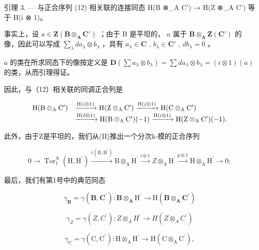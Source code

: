 引理 3. --- 与正合序列 (12) 相关联的连接同态 H(B ⊗\_A C') → H(Z ⊗\_A C') 等于 H(i ⊗ 1)。

事实上，设 \(a \in \mathbf{Z}(\mathbf{B} \otimes_{\mathbf{A}} \mathbf{C}')\) ；由于 B 是平坦的， \(a\) 属于 \(\mathbf{B} \otimes_{\mathbf{A}} \mathbf{Z}(\mathbf{C}')\) 的像，因此可以写成 \(\sum_{\lambda} da_{\lambda} \otimes b_{\lambda}\) ，具有 \(a_{\lambda} \in \mathbf{C}\) , \(b_{\lambda} \in \mathbf{C}'\) , \(db_{\lambda} = 0\) 。

\(a\) 的类在所求同态下的像按定义是 \(\mathbf{D}(\sum a_{\lambda}\otimes b_{\lambda})=\sum da_{\lambda}\otimes b_{\lambda}=(i\otimes1)(a)\) 的类，从而引理得证。

因此，与（12）相关联的同调正合列是

\[
\begin{array}{r l} \mathrm{H} (\mathrm{B} \otimes_ {\mathrm{A}} \mathrm{C} ^ {\prime}) & \xrightarrow {\mathrm{H} (i \otimes 1)} \mathrm{H} (\mathrm{Z} \otimes_ {\mathrm{A}} \mathrm{C} ^ {\prime}) \xrightarrow {\mathrm{H} (j \otimes 1)} \mathrm{H} (\mathrm{C} \otimes_ {\mathrm{A}} \mathrm{C} ^ {\prime}) \\ & \xrightarrow {\mathrm{H} (\delta \otimes 1)} \mathrm{H} (\mathrm{B} \otimes_ {\mathrm{A}} \mathrm{C} ^ {\prime}) (- 1) \xrightarrow {\mathrm{H} (i \otimes 1)} \mathrm{H} (\mathrm{Z} \otimes_ {\mathrm{A}} \mathrm{C} ^ {\prime}) (- 1). \end{array}
\]

此外，由于Z是平坦的，我们从(II)推出一个分次k-模的正合序列

\[
0 \longrightarrow \operatorname{Tor} _ {1} ^ {\mathrm{A}} (\mathrm{H}, \mathrm{H} ^ {\prime}) \xrightarrow {\hat {c} (\mathrm{II} , \mathrm{H} ^ {\prime})} \mathrm{B} \otimes_ {\mathrm{A}} \mathrm{H} ^ {\prime} \xrightarrow {i \otimes 1} Z \otimes_ {\mathrm{A}} \mathrm{H} ^ {\prime} \xrightarrow {p \otimes 1} \mathrm{H} \otimes_ {\mathrm{A}} \mathrm{H} ^ {\prime} \longrightarrow 0;
\]

最后，我们有第1号中的典范同态

\[
\gamma_ {\mathbf {B}} = \gamma (\mathbf {B}, \mathbf {C} ^ {\prime}): \mathbf {B} \otimes_ {\mathbf {A}} \mathrm{H} ^ {\prime} \rightarrow \mathrm{H} (\mathbf {B} \otimes_ {\mathbf {A}} \mathbf {C} ^ {\prime})
\]

\[
\gamma_ {Z} = \gamma (Z, C ^ {\prime}): Z \otimes_ {A} H ^ {\prime} \rightarrow H (Z \otimes_ {A} C ^ {\prime})
\]

\[
\gamma_ {\mathrm{C}} = \gamma (\mathrm{C}, \mathrm{C} ^ {\prime}): \mathrm{H} \otimes_ {\mathrm{A}} \mathrm{H} ^ {\prime} \rightarrow \mathrm{H} (\mathrm{C} \otimes_ {\mathrm{A}} \mathrm{C} ^ {\prime}),
\]

